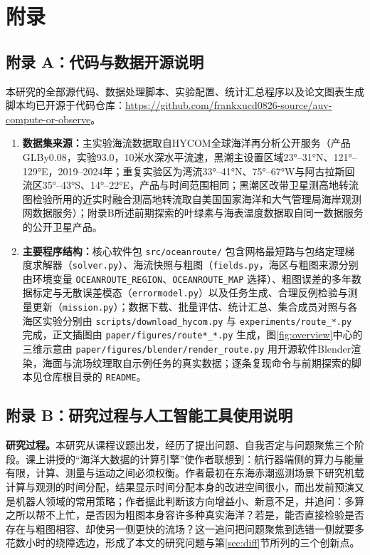 \section*{附录}

\subsection*{附录 A：代码与数据开源说明}
本研究的全部源代码、数据处理脚本、实验配置、统计汇总程序以及论文图表生成脚本均已开源于代码仓库：\url{https://github.com/frankxucd0826-source/auv-compute-or-observe}。

\begin{enumerate}
    \item \textbf{数据集来源：}主实验海流数据取自HYCOM全球海洋再分析公开服务（产品GLBy0.08，实验93.0，10米水深水平流速，黑潮主设置区域23°--31°N、121°--129°E，2019--2024年；重复实验区为湾流33°--41°N、75°--67°W与阿古拉斯回流区35°--43°S、14°--22°E，产品与时间范围相同；黑潮区改带卫星测高地转流图检验所用的近实时融合测高地转流取自美国国家海洋和大气管理局海岸观测网数据服务）；附录B所述前期探索的叶绿素与海表温度数据取自同一数据服务的公开卫星产品。
    \item \textbf{主要程序结构：}核心软件包 \texttt{src/oceanroute/} 包含网格最短路与包络定理梯度求解器（\texttt{solver.py}）、海流快照与粗图（\texttt{fields.py}，海区与粗图来源分别由环境变量 \texttt{OCEANROUTE\_REGION}、\texttt{OCEANROUTE\_MAP} 选择）、粗图误差的多年数据标定与无散误差模态（\texttt{errormodel.py}）以及任务生成、合理反例检验与测量更新（\texttt{mission.py}）；数据下载、批量评估、统计汇总、集合成员对照与各海区实验分别由 \texttt{scripts/download\_hycom.py} 与 \texttt{experiments/route\_*.py} 完成，正文插图由 \texttt{paper/figures/route*\_*.py} 生成，图\ref{fig:overview}中心的三维示意由 \texttt{paper/figures/blender/render\_route.py} 用开源软件Blender渲染，海面与流场纹理取自示例任务的真实数据；逐条复现命令与前期探索的脚本见仓库根目录的 \texttt{README}。
\end{enumerate}

\subsection*{附录 B：研究过程与人工智能工具使用说明}
\textbf{研究过程。}本研究从课程议题出发，经历了提出问题、自我否定与问题聚焦三个阶段。课上讲授的“海洋大数据的计算引擎”使作者联想到：航行器端侧的算力与能量有限，计算、测量与运动之间必须权衡。作者最初在东海赤潮巡测场景下研究机载计算与观测的时间分配，结果显示时间分配本身的改进空间很小，而出发前预演又是机器人领域的常用策略；作者据此判断该方向增益小、新意不足，并追问：多算之所以帮不上忙，是否因为粗图本身容许多种真实海洋？若是，能否直接检验是否存在与粗图相容、却使另一侧更快的流场？这一追问把问题聚焦到选错一侧就要多花数小时的绕障选边，形成了本文的研究问题与第\ref{sec:diff}节所列的三个创新点。


